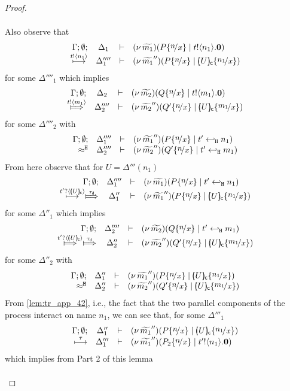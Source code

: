 \begin{proof}
\begin{enumerate}[1.]
\begin{itemize}
\begin{itemize}
\begin{eqnarray}
											\label{lem:tr_app_43}
										\end{eqnarray}
										Also observe that %
										\[
											\mhorel{\Gamma}{\Delta_1}{\newsp{\widetilde{m_1}}{P \subst{n}{x} \Par \bout{t}{n_1} \inact}}
											{ \hby{\bactout{t}{n_1}} }
											{\Delta_1''''}{}{\newsp{\widetilde{m_1}''}{P \subst{n}{x} \Par \omapchar{U} \subst{n_1}{x}}}
										\]
										for some $\Delta''''_1$
										which implies
										\[
											\mhorel{\Gamma}{\Delta_2}{\newsp{\widetilde{m_2}}{Q \subst{n}{x} \Par \bout{t}{m_1} \inact}}
											{ \Hby{\bactout{t}{m_1}} }
											{\Delta_2''''}{}{\newsp{\widetilde{m_2}''}{Q' \subst{n}{x} \Par \omapchar{U} \subst{m_1}{x}}}
										\]
										for some $\Delta''''_2$
										with
										\[
										\mhorel{\Gamma}{\Delta_1''''}{\newsp{\widetilde{m_1}''}{P \subst{n}{x} \Par \htrigger{t'}{n_1}}}
										{\hwb}
										{\Delta_2''''}{}{\newsp{\widetilde{m_2}''}{Q' \subst{n}{x} \Par \htrigger{t'}{m_1}}}
										\]
										From here observe that for $U = \Delta'''(n_1)$
										\[
										\mhorel{\Gamma}{\Delta_1''''}{\newsp{\widetilde{m_1}}{P \subst{n}{x} \Par \htrigger{t'}{n_1}}}
										{  \hby{\bactinp{t'}{\omapchar{U}}} \Hby{\dtau} }
										{\Delta_1''}{}{\newsp{\widetilde{m_1}''}{P \subst{n}{x} \Par \omapchar{U} \subst{n_1}{x}}}
										\]
										for some $\Delta''_1$
										which implies
										\[
										\mhorel{\Gamma}{\Delta_2''''}{\newsp{\widetilde{m_2}}{Q \subst{n}{x} \Par \htrigger{t'}{m_1}}}
										{ \Hby{\bactinp{t'}{\omapchar{U}}} \Hby{\dtau} }
										{\Delta_2''}{}{\newsp{\widetilde{m_2}''}{Q' \subst{n}{x} \Par \omapchar{U} \subst{m_1}{x}}}
										\]
										for some $\Delta''_2$
										with
										\[
											\mhorel{\Gamma}{\Delta_1''}{\newsp{\widetilde{m_1}''}{P \subst{n}{x} \Par \omapchar{U} \subst{n_1}{x}}}
											{\hwb}
											{\Delta_2''}{}{\newsp{\widetilde{m_2}''}{Q' \subst{n}{x} \Par \omapchar{U} \subst{m_1}{x}}}
										\]
										From \eqref{lem:tr_app_42}, i.e., the fact that the two parallel components of the process interact on name $n_1$, we can see that, for some $\Delta'''_1$
										\[
											\mhorel{\Gamma}{\Delta_1''}{\newsp{\widetilde{m_1}''}{P \subst{n}{x} \Par \omapchar{U} \subst{n_1}{x}}}
											{ \hby{\tau} }
											{\Delta_1'''}{}{\newsp{\widetilde{m_1}''}{P_2 \subst{n}{x} \Par \bout{t'}{n_1} \inact}}
										\]
										which implies from Part 2 of this lemma
										\begin{eqnarray}

\end{eqnarray}
\end{itemize}
\end{itemize}
\end{enumerate}
\end{proof}
